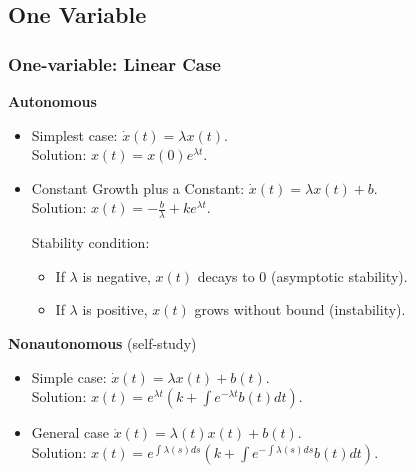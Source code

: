 \documentclass[
10pt, %
]{beamer}
\begin{document}
\subsection{One Variable}
\begin{frame}
\frametitle{One-variable: Linear Case}

\textbf{Autonomous}
\begin{itemize}
\item Simplest case: $\dot{x}(t) = \lambda x(t)$. \\
Solution: $x(t) = x(0) e^{\lambda t}$.


\item Constant Growth plus a Constant: $\dot{x}(t) = \lambda x(t) + b$.\\
Solution: $x(t) = -\frac{b}{\lambda} + k e^{\lambda t}$.


\begin{theorem}
Stability condition:
\begin{itemize}
\item If $\lambda$ is negative, $x(t)$ decays to 0 (asymptotic stability).
\item If $\lambda$ is positive, $x(t)$ grows without bound (instability).
\end{itemize}
\end{theorem}
\end{itemize}

\textbf{Nonautonomous} (self-study)
\begin{itemize} 
\item Simple case: $\dot{x}(t) = \lambda x(t) + b(t)$. \\
Solution: $x(t) = e^{\lambda t} \left( k + \int e^{-\lambda t} b(t) dt \right)$.

\item General case
$\dot{x}(t) = \lambda(t) x(t) + b(t)$. \\
Solution: $x(t) = e^{\int \lambda(s) ds} \left( k + \int e^{-\int \lambda(s) ds} b(t) dt \right)$.

\end{itemize}
\end{frame}
\end{document}
